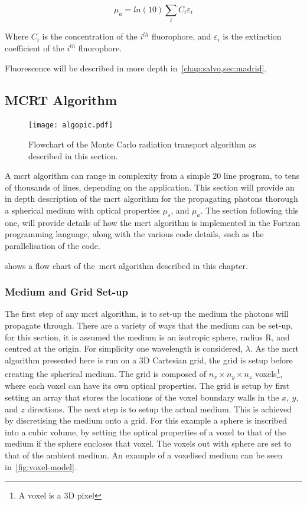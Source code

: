 \begin{equation}
\mu_a=ln(10) \sum_i C_i \varepsilon_i
\label{eqn:exct}	
\end{equation}

Where $C_i$ is the concentration of the $i^{th}$ fluorophore, and $\varepsilon_i$ is the extinction coefficient of the $i^{th}$ fluorophore.

Fluorescence will be described in more depth in~\cref{chap:salvo,sec:madrid}.
\newpage
\subsection{MCRT Algorithm}\label{sec:algorithmMCRT}

\begin{figure}
\centering
\texttt{[image: algopic.pdf]}
\caption{Flowchart of the Monte Carlo radiation transport algorithm as described in this section.}
\label{fig:algo}
\vspace{-80pt}
\end{figure}
\leavevmode
\FloatBarrier

A \gls*{mcrt} algorithm can range in complexity from a simple 20 line program, to tens of thousands of lines, depending on the application. This section will provide an in depth description of the \gls*{mcrt} algorithm for the propagating photons thorough a spherical medium with optical properties $\mu_s$, and $\mu_a$. The section following this one, will provide details of how the \gls*{mcrt} algorithm is implemented in the Fortran programming language, along with the various code details, such as the parallelisation of the code.

 shows a flow chart of the~\gls*{mcrt} algorithm described in this chapter.


\subsubsection*{Medium and Grid Set-up}\label{sec:algomedium}
The first step of any \gls*{mcrt} algorithm, is to set-up the medium the photons will propagate through. There are a variety of ways that the medium can be set-up, for this section, it is assumed the medium is an isotropic sphere, radius R, and centred at the origin. For simplicity one wavelength is considered, $\lambda$. As the \gls*{mcrt} algorithm presented here is run on a 3D Cartesian grid, the grid is setup before creating the spherical medium. The grid is composed of $n_x \times n_y \times n_z$ voxels\footnote{A voxel is a 3D pixel}, where each voxel can have its own optical properties.
The grid is setup by first setting an array that stores the locations of the voxel boundary walls in the $x,\ y$, and $z$ directions. 
The next step is to setup the actual medium. This is achieved by discretising the medium onto a grid. 
For this example a sphere is inscribed into a cubic volume, by setting the optical properties of a voxel to that of the medium if the sphere encloses that voxel. The voxels out with sphere are set to that of the ambient medium. An example of a voxelised medium can be seen in~\cref{fig:voxel-model}. 



